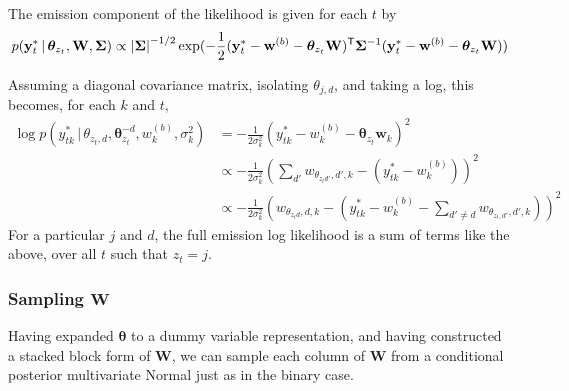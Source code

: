 \documentclass[12pt,letterpaper]{report}
\newcommand{\given}{\, \vert \,}
\newcommand{\abs}[1]{\left\vert #1 \right\vert}
\newcommand{\by}{\mathbf{y}}
\newcommand{\bw}{\mathbf{w}}
\newcommand{\bW}{\mathbf{W}}
\newcommand{\btheta}{\boldsymbol{\theta}}
\newcommand{\bSigma}{\boldsymbol{\Sigma}}
\begin{document}
The emission component of the likelihood is given for each $t$ by
\begin{equation}
  p(\by_t^* \given \btheta_{z_t}, \bW, \bSigma) \propto \abs{\bSigma}^{-1/2}
  \exp(-\frac{1}{2} (\by^*_t - \bw^{(b)} -
  \btheta_{z_t}\bW)^{\sf T}\bSigma^{-1}(\by^*_t - \bw^{(b)} - \btheta_{z_t}\bW))
\end{equation}

Assuming a diagonal covariance matrix, isolating $\theta_{j,d}$, and
taking a log, this becomes, for each $k$ and $t$,
\begin{align}
  \log p(y_{tk}^* \given \theta_{z_t,d}, \btheta_{z_t}^{-d}, w^{(b)}_k, \sigma^2_k) &=
   -\frac{1}{2\sigma^2_k} \left(y^*_{tk} -
      w^{(b)}_k-\btheta_{z_t}\bw_k\right)^2 \\
  &\propto -\frac{1}{2\sigma^2_k} (\sum_{d'} w_{\theta_{z_td'},d',k} -
    (y^*_{tk} - w^{(b)}_k))^2 \\
  &\propto -\frac{1}{2\sigma^2_k}(w_{\theta_{z_td},d,k} - (y^*_{tk} -
    w^{(b)}_k - \sum_{d' \neq d} w_{\theta_{z_t,d'},d',k}))^2
\end{align}
For a particular $j$ and $d$, the full emission log likelihood is a sum of
terms like the above, over all $t$ such that $z_t = j$.

\subsubsection{Sampling $\bW$}
Having expanded $\btheta$ to a dummy variable representation, and
having constructed a stacked block form of $\bW$, we can sample each
column of $\bW$ from a conditional posterior multivariate Normal just
as in the binary case.

\end{document}
